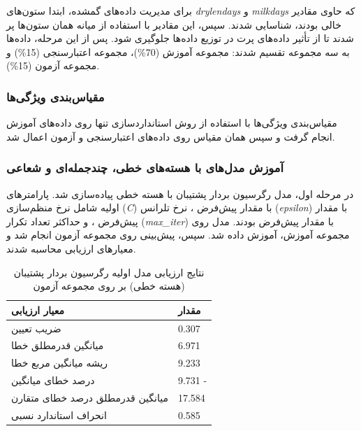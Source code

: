 برای مدیریت داده‌های گمشده، ابتدا ستون‌های \textit{drylendays} و \textit{milkdays} که حاوی مقادیر خالی بودند، شناسایی شدند. سپس، این مقادیر با استفاده از میانه همان ستون‌ها پر شدند تا از تأثیر داده‌های پرت در توزیع داده‌ها جلوگیری شود. پس از این مرحله، داده‌ها به سه مجموعه تقسیم شدند: مجموعه آموزش (70\%)، مجموعه اعتبارسنجی (15\%) و مجموعه آزمون (15\%). 

\subsubsection{مقیاس‌بندی ویژگی‌ها}

مقیاس‌بندی ویژگی‌ها با استفاده از روش استانداردسازی تنها روی داده‌های آموزش انجام گرفت و سپس همان مقیاس روی داده‌های اعتبارسنجی و آزمون اعمال شد.

\subsubsection{آموزش مدل‌های با هسته‌های خطی، چندجمله‌ای و شعاعی}

در مرحله اول، مدل رگرسیون بردار پشتیبان با هسته خطی پیاده‌سازی شد. پارامترهای اولیه شامل نرخ منظم‌سازی (\textit{C}) با مقدار پیش‌فرض \texttt{}، نرخ تلرانس (\textit{epsilon}) با مقدار پیش‌فرض \texttt{}، و حداکثر تعداد تکرار (\textit{max\_iter}) با مقدار پیش‌فرض \texttt{} بودند. مدل روی مجموعه آموزش، آموزش داده شد. سپس، پیش‌بینی روی مجموعه آزمون انجام شد و معیارهای ارزیابی محاسبه شدند.

\vspace{0.3cm}
\begin{table}[H]
	\centering
	\caption{نتایج ارزیابی مدل اولیه رگرسیون بردار پشتیبان (هسته خطی) بر روی مجموعه آزمون}
	\renewcommand{\arraystretch}{1.3}
	\begin{tabular}{
			>{\centering\arraybackslash}m{4cm}
			>{\centering\arraybackslash}m{3cm}
		}
		\toprule
		\textbf{معیار ارزیابی} & \textbf{مقدار} \\
		\midrule
		ضریب تعیین & \num{0.307} \\
		میانگین قدرمطلق خطا & \num{6.971} \\
		ریشه میانگین مربع خطا & \num{9.233} \\
		درصد خطای میانگین & \num{9.731} - \\
		میانگین قدرمطلق درصد خطای متقارن & \num{17.584} \\
		انحراف استاندارد نسبی & \num{0.585} \\
		\bottomrule
	\end{tabular}
	\label{tab:svr_initial_linear}
\end{table}
\vspace{0.5cm}

